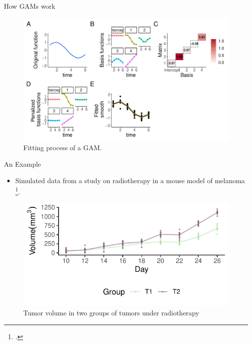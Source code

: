 \documentclass[
  ignorenonframetext,
]{beamer}
\providecommand{\tightlist}{%
  \setlength{\itemsep}{0pt}\setlength{\parskip}{0pt}}\usepackage{longtable,booktabs,array}
\begin{document}
\begin{frame}{How GAMs work}
\protect\hypertarget{how-gams-work}{}
\begin{figure}

{\centering \includegraphics{MfPH_Next_Generation_AM_March_2023_files/figure-beamer/basis-functions-plot-1.pdf}

}

\caption{Fitting process of a GAM.}

\end{figure}
\end{frame}

\begin{frame}{An Example}
\protect\hypertarget{an-example}{}
\begin{itemize}[<+->]
\tightlist
\item
  Simulated data from a study on radiotherapy in a mouse model of
  melanoma \footcite{sen2011}.
\end{itemize}

\begin{figure}

{\centering \includegraphics{MfPH_Next_Generation_AM_March_2023_files/figure-beamer/simulated-data-1.pdf}

}

\caption{Tumor volume in two groups of tumors under radiotherapy}

\end{figure}
\end{frame}
\end{document}
